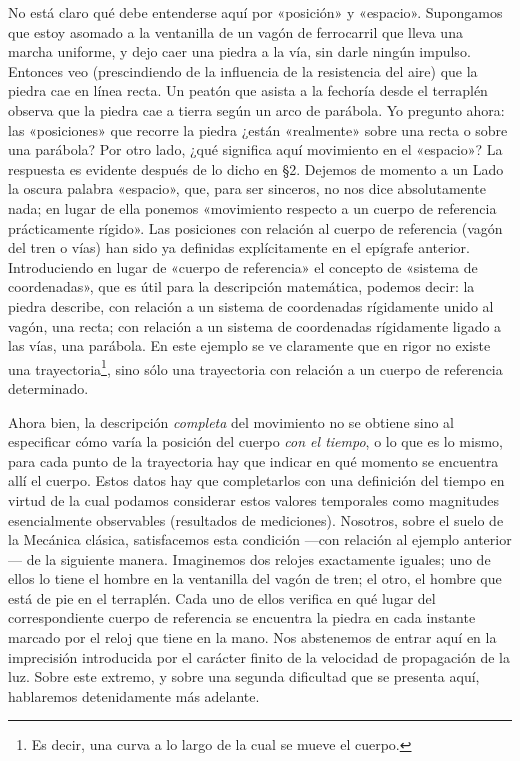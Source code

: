 \documentclass[spanish]{book}
\begin{document}
No está claro qué debe entenderse aquí por «posición» y «espacio». Supongamos que
estoy asomado a la ventanilla de un vagón de ferrocarril que lleva una marcha
uniforme, y dejo caer una piedra a la vía, sin darle ningún impulso. Entonces veo
(prescindiendo de la influencia de la resistencia del aire) que la piedra cae en línea
recta. Un peatón que asista a la fechoría desde el terraplén observa que la piedra cae a
tierra según un arco de parábola. Yo pregunto ahora: las «posiciones» que recorre la
piedra ¿están «realmente» sobre una recta o sobre una parábola? Por otro lado, ¿qué
significa aquí movimiento en el «espacio»? La respuesta es evidente después de lo
dicho en §2. Dejemos de momento a un Lado la oscura palabra «espacio», que, para ser
sinceros, no nos dice absolutamente nada; en lugar de ella ponemos «movimiento
respecto a un cuerpo de referencia prácticamente rígido». Las posiciones con relación al
cuerpo de referencia (vagón del tren o vías) han sido ya definidas explícitamente en el
epígrafe anterior. Introduciendo en lugar de «cuerpo de referencia» el concepto de
«sistema de coordenadas», que es útil para la descripción matemática, podemos decir:
la piedra describe, con relación a un sistema de coordenadas rígidamente unido al
vagón, una recta; con relación a un sistema de coordenadas rígidamente ligado a las
vías, una parábola. En este ejemplo se ve claramente que en rigor no existe una
trayectoria\footnote{Es decir, una curva a lo largo de la cual se mueve el cuerpo.},
sino sólo una trayectoria con relación a un cuerpo de referencia 
determinado.
   
Ahora bien, la descripción \textit{completa} del movimiento no se obtiene sino al especificar
cómo varía la posición del cuerpo \textit{con el tiempo}, o lo que es lo mismo, para cada
punto de la trayectoria hay que indicar en qué momento se encuentra allí el cuerpo.
Estos datos hay que completarlos con una definición del tiempo en virtud de la cual
podamos considerar estos valores temporales como magnitudes esencialmente
observables (resultados de mediciones). Nosotros, sobre el suelo de la Mecánica
clásica, satisfacemos esta condición —con relación al ejemplo anterior— de la siguiente
manera. Imaginemos dos relojes exactamente iguales; uno de ellos lo tiene el hombre
en la ventanilla del vagón de tren; el otro, el hombre que está de pie en el terraplén.
Cada uno de ellos verifica en qué lugar del correspondiente cuerpo de referencia se
encuentra la piedra en cada instante marcado por el reloj que tiene en la mano.
Nos abstenemos de entrar aquí en la imprecisión introducida por el carácter finito de
la velocidad de propagación de la luz. Sobre este extremo, y sobre una segunda
dificultad que se presenta aquí, hablaremos detenidamente más adelante.
\end{document}
